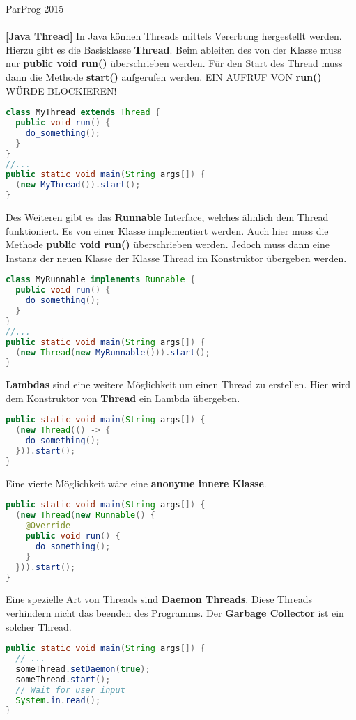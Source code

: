 \documentclass[8pt]{extarticle}
\let\oldtextbf\textbf
\renewcommand{\textbf}{\tiny\oldtextbf}
\begin{document}
\begin{multicols*}{5}
\huge{ParProg 2015}\\\\
\textbf{[Java Thread]}
In Java können Threads mittels Vererbung hergestellt werden. Hierzu gibt es die Basisklasse \textbf{Thread}. Beim ableiten des von der Klasse muss nur \textbf{public void run()} überschrieben werden. Für den Start des Thread muss dann die Methode \textbf{start()} aufgerufen werden. EIN AUFRUF VON \textbf{run()} WÜRDE BLOCKIEREN!
\begin{lstlisting}[language=java]
class MyThread extends Thread {
  public void run() {
    do_something();
  }
}
//...
public static void main(String args[]) {
  (new MyThread()).start();
}
\end{lstlisting}
Des Weiteren gibt es das \textbf{Runnable} Interface, welches ähnlich dem Thread funktioniert. Es von einer Klasse implementiert werden. Auch hier muss die Methode \textbf{public void run()} überschrieben werden. Jedoch muss dann eine Instanz der neuen Klasse der Klasse Thread im Konstruktor übergeben werden.
\begin{lstlisting}[language=java]
class MyRunnable implements Runnable {
  public void run() {
    do_something();
  }
}
//...
public static void main(String args[]) {
  (new Thread(new MyRunnable())).start();
}
\end{lstlisting}
\textbf{Lambdas} sind eine weitere Möglichkeit um einen Thread zu erstellen. Hier wird dem Konstruktor von \textbf{Thread} ein Lambda übergeben.
\begin{lstlisting}[language=java]
public static void main(String args[]) {
  (new Thread(() -> {
    do_something();
  })).start();
}
\end{lstlisting}
Eine vierte Möglichkeit wäre eine \textbf{anonyme innere Klasse}.
\begin{lstlisting}[language=java]
public static void main(String args[]) {
  (new Thread(new Runnable() {
    @Override
    public void run() {
      do_something();
    }
  })).start();
}
\end{lstlisting}
Eine spezielle Art von Threads sind \textbf{Daemon Threads}. Diese Threads verhindern nicht das beenden des Programms. Der \textbf{Garbage Collector} ist ein solcher Thread.
\begin{lstlisting}[language=java]
public static void main(String args[]) {
  // ...
  someThread.setDaemon(true);
  someThread.start();
  // Wait for user input
  System.in.read();
}
\end{lstlisting}

\end{multicols*}
\end{document}
